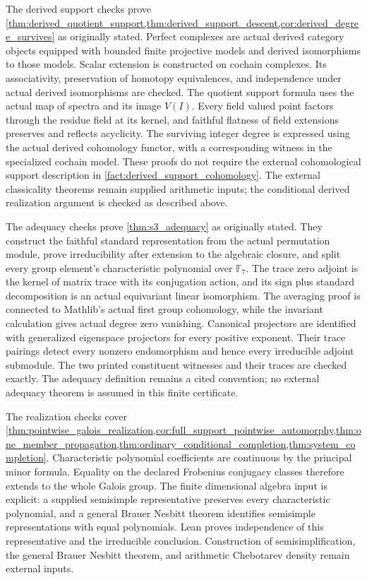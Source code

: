 \documentclass[11pt]{amsart}
\theoremstyle{definition}
\theoremstyle{remark}
\newcommand{\FF}{\mathbb F}
\begin{document}
The derived support checks prove \cref{thm:derived_quotient_support,thm:derived_support_descent,cor:derived_degree_survives} as originally stated. Perfect complexes are actual derived category objects equipped with bounded finite projective models and derived isomorphisms to those models. Scalar extension is constructed on cochain complexes. Its associativity, preservation of homotopy equivalences, and independence under actual derived isomorphisms are checked. The quotient support formula uses the actual map of spectra and its image \(V(I)\). Every field valued point factors through the residue field at its kernel, and faithful flatness of field extensions preserves and reflects acyclicity. The surviving integer degree is expressed using the actual derived cohomology functor, with a corresponding witness in the specialized cochain model. These proofs do not require the external cohomological support description in \cref{fact:derived_support_cohomology}. The external classicality theorems remain supplied arithmetic inputs; the conditional derived realization argument is checked as described above.

The adequacy checks prove \cref{thm:s3_adequacy} as originally stated. They construct the faithful standard representation from the actual permutation module, prove irreducibility after extension to the algebraic closure, and split every group element's characteristic polynomial over \(\FF_7\). The trace zero adjoint is the kernel of matrix trace with its conjugation action, and its sign plus standard decomposition is an actual equivariant linear isomorphism. The averaging proof is connected to Mathlib's actual first group cohomology, while the invariant calculation gives actual degree zero vanishing. Canonical projectors are identified with generalized eigenspace projectors for every positive exponent. Their trace pairings detect every nonzero endomorphism and hence every irreducible adjoint submodule. The two printed constituent witnesses and their traces are checked exactly. The adequacy definition remains a cited convention; no external adequacy theorem is assumed in this finite certificate.

The realization checks cover \cref{thm:pointwise_galois_realization,cor:full_support_pointwise_automorphy,thm:one_member_propagation,thm:ordinary_conditional_completion,thm:system_completion}. Characteristic polynomial coefficients are continuous by the principal minor formula. Equality on the declared Frobenius conjugacy classes therefore extends to the whole Galois group. The finite dimensional algebra input is explicit: a supplied semisimple representative preserves every characteristic polynomial, and a general Brauer Nesbitt theorem identifies semisimple representations with equal polynomials. Lean proves independence of this representative and the irreducible conclusion. Construction of semisimplification, the general Brauer Nesbitt theorem, and arithmetic Chebotarev density remain external inputs.
\end{document}
